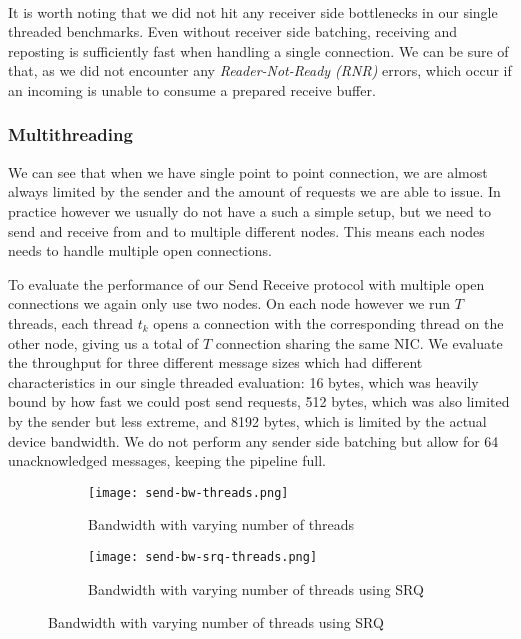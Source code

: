 \paragraph{} It is worth noting that we did not hit any receiver side bottlenecks in our single threaded benchmarks.
Even without receiver side batching, receiving and reposting is sufficiently fast when handling a single connection.
We can be sure of that, as we did not encounter any \emph{Reader-Not-Ready (RNR)} errors, which occur if an incoming
is unable to consume a prepared receive buffer.

\subsubsection{Multithreading}

We can see that when we have single point to point connection, we are almost always limited by the sender and the 
amount of requests we are able to issue. In practice however we usually do not have a such a simple setup, but we
need to send and receive from and to multiple different nodes. This means each nodes needs to handle multiple open
connections. 

To evaluate the performance of our Send Receive protocol with multiple open connections we again only use two nodes.  
On each node however we run $T$ threads, each thread $t_k$ opens a connection with the corresponding 
thread on the other node, giving us a total of $T$ connection sharing the same NIC. We evaluate the throughput for 
three different message sizes which had different characteristics in our single threaded evaluation: 16 bytes, 
which was heavily bound by how fast we could post send requests, 512 bytes, which was also limited by the sender
but less extreme, and 8192 bytes, which is limited by the actual device bandwidth. We do not perform any sender side
batching but allow for 64 unacknowledged messages, keeping the pipeline full.

\begin{figure}[]
\begin{subfigure}[b]{0.49\textwidth}
  \centering
  \texttt{[image: send-bw-threads.png]}
  \caption{Bandwidth with varying number of threads}
  \label{fig:plot-sndrcv-bw-thread}
\end{subfigure}
\begin{subfigure}[b]{0.49\textwidth}
  \centering
  \texttt{[image: send-bw-srq-threads.png]}
  \caption{Bandwidth with varying number of threads using SRQ}
  \label{fig:plot-sndrcv-bw-thread-srq}
\end{subfigure}
\end{figure}


